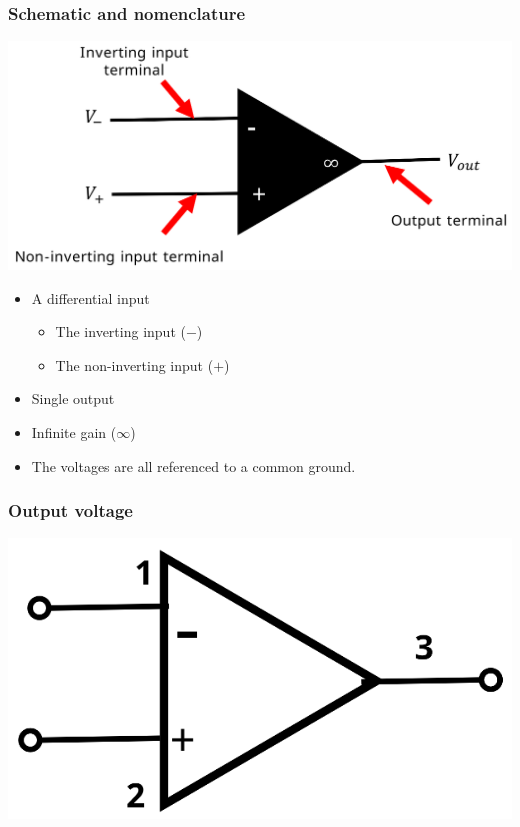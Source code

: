 \documentclass[11pt]{article}
\begin{document}
\subsubsection{Schematic and nomenclature}
\label{sec:orgef67f69}
\begin{center}
\includegraphics[width=.9\linewidth]{./images/parts-of-an-operational-amplifier.png}
\end{center}

\begin{itemize}
\item A differential input
\begin{itemize}
\item The inverting input (\(-\))
\item The non-inverting input (\(+\))
\end{itemize}
\item Single output
\item Infinite gain (\(\infty\))
\item The voltages are all referenced to a common ground.
\end{itemize}
\subsubsection{Output voltage}
\label{sec:org7249bae}
\begin{center}
\includegraphics[width=.9\linewidth]{./images/operational-amplifier-diagram.png}
\end{center}
\end{document}

